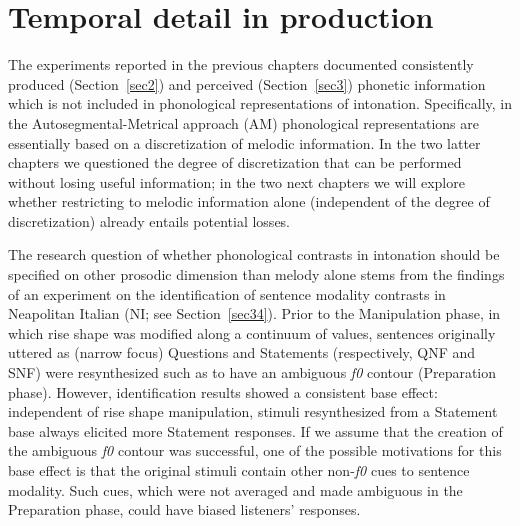 \chapter[Temporal detail in production]{Temporal detail in production}\label{sec4}
The experiments reported in the previous chapters documented consistently produced (Section~\ref{sec2}) and perceived (Section~\ref{sec3}) phonetic information which is not included in phonological representations of intonation. Specifically, in the Autosegmental-Metrical approach (AM) phonological representations are essentially based on a discretization of melodic information. In the two latter chapters we questioned the degree of discretization that can be performed without losing useful information; in the two next chapters we will explore whether restricting to melodic information alone (independent of the degree of discretization) already entails potential losses. 

The research question of whether phonological contrasts in intonation should be specified on other prosodic dimension than melody alone stems from the findings of an experiment on the identification of sentence modality contrasts in Neapolitan Italian (NI; see Section~\ref{sec34}). Prior to the Manipulation phase, in which rise shape was modified along a continuum of values, sentences originally uttered as (narrow focus) Questions and Statements (respectively, QNF and SNF) were resynthesized such as to have an ambiguous \textit{f0} contour (Preparation phase). However, identification results showed a consistent base effect: independent of rise shape manipulation, stimuli resynthesized from a Statement base always elicited more Statement responses. If we assume that the creation of the ambiguous \textit{f0} contour was successful, one of the possible motivations for this base effect is that the original stimuli contain other non-\textit{f0} cues to sentence modality. Such cues, which were not averaged and made ambiguous in the Preparation phase, could have biased listeners' responses.

